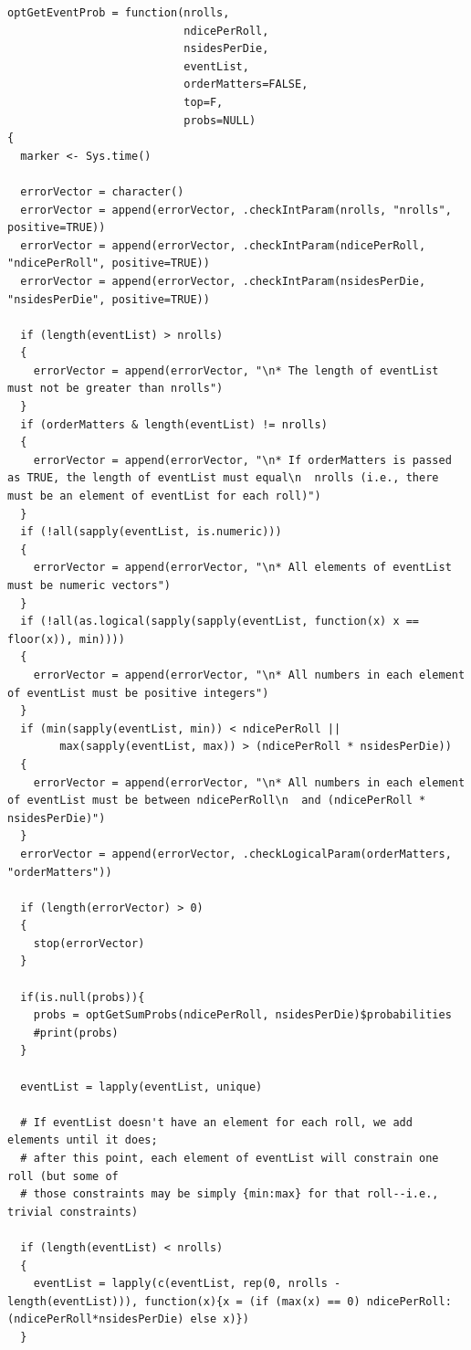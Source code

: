 \documentclass[12pt]{article}
\begin{document}
\begin{lstlisting}
optGetEventProb = function(nrolls,
                           ndicePerRoll,
                           nsidesPerDie,
                           eventList,
                           orderMatters=FALSE,
                           top=F,
                           probs=NULL)
{
  marker <- Sys.time()
  
  errorVector = character()
  errorVector = append(errorVector, .checkIntParam(nrolls, "nrolls", positive=TRUE))
  errorVector = append(errorVector, .checkIntParam(ndicePerRoll, "ndicePerRoll", positive=TRUE))
  errorVector = append(errorVector, .checkIntParam(nsidesPerDie, "nsidesPerDie", positive=TRUE))
  
  if (length(eventList) > nrolls)
  {
    errorVector = append(errorVector, "\n* The length of eventList must not be greater than nrolls")
  }
  if (orderMatters & length(eventList) != nrolls)
  {
    errorVector = append(errorVector, "\n* If orderMatters is passed as TRUE, the length of eventList must equal\n  nrolls (i.e., there must be an element of eventList for each roll)")
  }
  if (!all(sapply(eventList, is.numeric)))
  {
    errorVector = append(errorVector, "\n* All elements of eventList must be numeric vectors")
  }
  if (!all(as.logical(sapply(sapply(eventList, function(x) x == floor(x)), min))))
  {
    errorVector = append(errorVector, "\n* All numbers in each element of eventList must be positive integers")
  }
  if (min(sapply(eventList, min)) < ndicePerRoll ||
        max(sapply(eventList, max)) > (ndicePerRoll * nsidesPerDie))
  {
    errorVector = append(errorVector, "\n* All numbers in each element of eventList must be between ndicePerRoll\n  and (ndicePerRoll * nsidesPerDie)")
  }
  errorVector = append(errorVector, .checkLogicalParam(orderMatters, "orderMatters"))
  
  if (length(errorVector) > 0)
  {
    stop(errorVector)
  }
  
  if(is.null(probs)){
    probs = optGetSumProbs(ndicePerRoll, nsidesPerDie)$probabilities
    #print(probs)
  }
  
  eventList = lapply(eventList, unique)
  
  # If eventList doesn't have an element for each roll, we add elements until it does;
  # after this point, each element of eventList will constrain one roll (but some of 
  # those constraints may be simply {min:max} for that roll--i.e., trivial constraints)
  
  if (length(eventList) < nrolls)
  {
    eventList = lapply(c(eventList, rep(0, nrolls - length(eventList))), function(x){x = (if (max(x) == 0) ndicePerRoll:(ndicePerRoll*nsidesPerDie) else x)})    
  }
  

\end{lstlisting}
\end{document}
